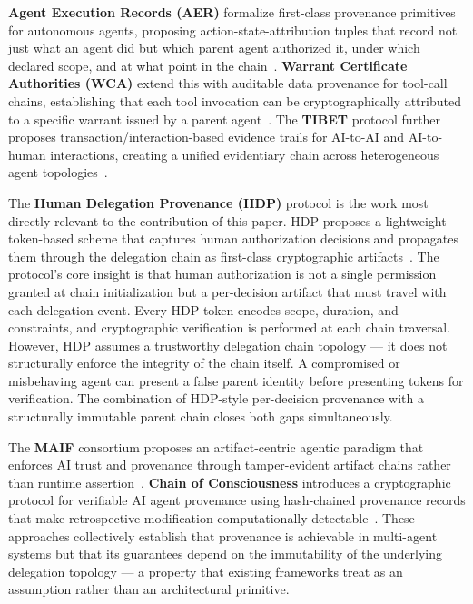 \textbf{Agent Execution Records (AER)} formalize first-class provenance primitives for autonomous agents, proposing action-state-attribution tuples that record not just what an agent did but which parent agent authorized it, under which declared scope, and at what point in the chain~\cite{aer2025}. \textbf{Warrant Certificate Authorities (WCA)} extend this with auditable data provenance for tool-call chains, establishing that each tool invocation can be cryptographically attributed to a specific warrant issued by a parent agent~\cite{wca2025}. The \textbf{TIBET} protocol further proposes transaction/interaction-based evidence trails for AI-to-AI and AI-to-human interactions, creating a unified evidentiary chain across heterogeneous agent topologies~\cite{tibet2026}.

The \textbf{Human Delegation Provenance (HDP)} protocol is the work most directly relevant to the contribution of this paper. HDP proposes a lightweight token-based scheme that captures human authorization decisions and propagates them through the delegation chain as first-class cryptographic artifacts~\cite{hdp2026}. The protocol's core insight is that human authorization is not a single permission granted at chain initialization but a per-decision artifact that must travel with each delegation event. Every HDP token encodes scope, duration, and constraints, and cryptographic verification is performed at each chain traversal. However, HDP assumes a trustworthy delegation chain topology — it does not structurally enforce the integrity of the chain itself. A compromised or misbehaving agent can present a false parent identity before presenting tokens for verification. The combination of HDP-style per-decision provenance with a structurally immutable parent chain closes both gaps simultaneously.

The \textbf{MAIF} consortium proposes an artifact-centric agentic paradigm that enforces AI trust and provenance through tamper-evident artifact chains rather than runtime assertion~\cite{maif2025}. \textbf{Chain of Consciousness} introduces a cryptographic protocol for verifiable AI agent provenance using hash-chained provenance records that make retrospective modification computationally detectable~\cite{chainofconsciousness2026}. These approaches collectively establish that provenance is achievable in multi-agent systems but that its guarantees depend on the immutability of the underlying delegation topology — a property that existing frameworks treat as an assumption rather than an architectural primitive.

